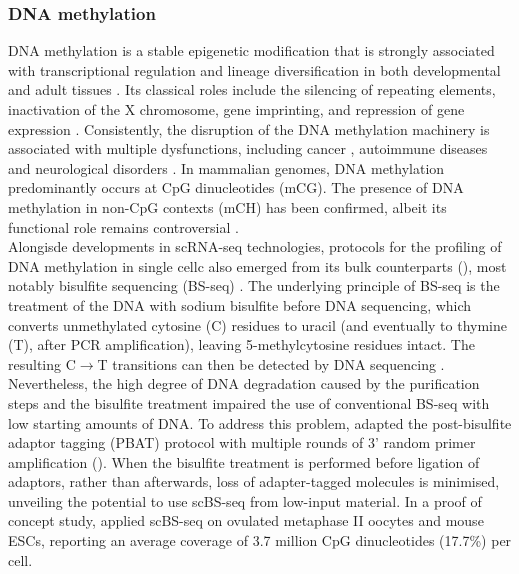 \subsubsection{DNA methylation} \label{section:dna_methylation}
DNA methylation is a stable epigenetic modification that is strongly associated with transcriptional regulation and lineage diversification in both developmental and adult tissues \cite{Jin2018, Harrison2011, Lee2014, Smith2013}. Its classical roles include the silencing of repeating elements, inactivation of the X chromosome, gene imprinting, and repression of gene expression \cite{Jones2012}. Consistently, the disruption of the DNA methylation machinery is associated with multiple dysfunctions, including cancer \cite{Baylin2011}, autoimmune diseases \cite{Liu2013} and neurological disorders \cite{Amir1999}. In mammalian genomes, DNA methylation predominantly occurs at CpG dinucleotides (mCG). The presence of DNA methylation in non-CpG contexts (mCH) has been confirmed, albeit its functional role remains controversial \cite{He2015, Ramsahoye2000, Lister2009}.\\
Alongisde developments in scRNA-seq technologies, protocols for the profiling of DNA methylation in single cellc also emerged from its bulk counterparts (), most notably bisulfite sequencing (BS-seq) \cite{Smallwood2014,Guo2013,Gravina2016,Farlik2015}. The underlying principle of BS-seq is the treatment of the DNA with sodium bisulfite before DNA sequencing, which converts unmethylated cytosine (C) residues to uracil (and eventually to thymine (T), after PCR amplification), leaving 5-methylcytosine residues intact. The resulting C$\to$T transitions can then be detected by DNA sequencing \cite{Frommer1992,Clark2016,Clark2017}. Nevertheless, the high degree of DNA degradation caused by the purification steps and the bisulfite treatment impaired the use of conventional BS-seq with low starting amounts of DNA. To address this problem, \cite{Smallwood2014} adapted the post-bisulfite adaptor tagging (PBAT) protocol with multiple rounds of 3' random primer amplification (). When the bisulfite treatment is performed before ligation of adaptors, rather than afterwards, loss of adapter-tagged molecules is minimised, unveiling the potential to use scBS-seq from low-input material. In a proof of concept study, \cite{Smallwood2014} applied scBS-seq on ovulated metaphase II oocytes and mouse ESCs, reporting an average coverage of 3.7 million CpG dinucleotides (17.7\%) per cell.


